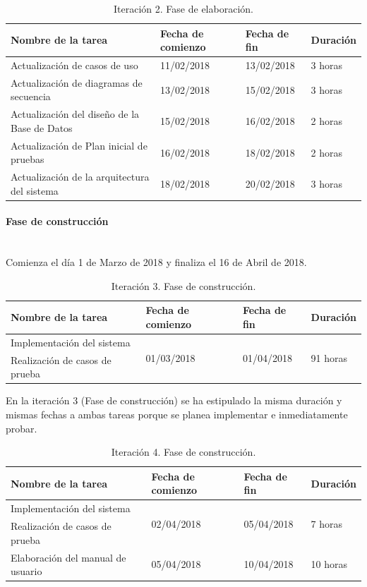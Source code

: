 \documentclass[twoside]{report}
\begin{document}
\begin{table}[H]
\centering
\begin{tabular}{|l|l|l|l|}
\hline
Nombre de la tarea                           & Fecha de comienzo & Fecha de fin & Duración \\ \hline
Actualización de casos de uso                & 11/02/2018        & 13/02/2018   & 3 horas   \\ \hline
Actualización de diagramas de secuencia      & 13/02/2018        & 15/02/2018   & 3 horas   \\ \hline
Actualización del diseño de la Base de Datos & 15/02/2018        & 16/02/2018   & 2 horas   \\ \hline
Actualización de Plan inicial de pruebas     & 16/02/2018        & 18/02/2018   & 2 horas   \\ \hline
Actualización de la arquitectura del sistema & 18/02/2018        & 20/02/2018   & 3 horas   \\ \hline
\end{tabular}
\caption{Iteración 2. Fase de elaboración.}
\end{table}

\paragraph{Fase de construcción}\mbox{}\\

Comienza el día 1 de Marzo de 2018 y finaliza el 16 de Abril de 2018.

\begin{table}[H]
\centering
\begin{tabular}{|l|l|l|l|}
\hline
Nombre de la tarea             & Fecha de comienzo & Fecha de fin & Duración \\ \hline
Implementación del sistema & \multirow{2}{*}{01/03/2018}  & \multirow{2}{*}{01/04/2018}   & \multirow{2}{*}{91 horas}  \\
Realización de casos de prueba & & & \\
\hline
\end{tabular}
\caption{Iteración 3. Fase de construcción.}
\end{table}

En la iteración 3 (Fase de construcción) se ha estipulado la misma duración y mismas fechas a ambas tareas porque se planea implementar e inmediatamente probar.

\begin{table}[H]
\centering
\begin{tabular}{|l|l|l|l|}
\hline
Nombre de la tarea                & Fecha de comienzo & Fecha de fin & Duración \\ \hline
Implementación del sistema        & \multirow{2}{*}{02/04/2018} & \multirow{2}{*}{05/04/2018}   & \multirow{2}{*}{7 horas}  \\
Realización de casos de prueba    & &   &   \\ \hline
Elaboración del manual de usuario & 05/04/2018        & 10/04/2018   & 10 horas   \\ \hline

\end{tabular}
\caption{Iteración 4. Fase de construcción.}
\end{table}
\end{document}
